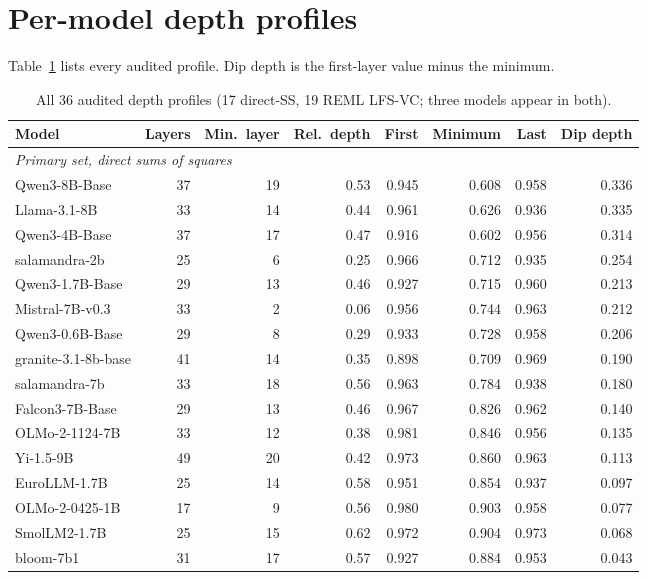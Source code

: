 \documentclass{article} %
\begin{document}
\section{Per-model depth profiles}
\label{app:profiles}
Table~\ref{tab:depth_profiles} lists every audited profile. Dip depth is the first-layer value minus the minimum.
\begin{table}[h]\caption{All 36 audited depth profiles (17 direct-SS, 19 REML LFS-VC; three models appear in both).}\label{tab:depth_profiles}
\begin{center}\scriptsize
\begin{tabular}{lrrrrrrr}
\toprule
Model & Layers & Min.\ layer & Rel.\ depth & First & Minimum & Last & Dip depth \\
\midrule
\multicolumn{8}{l}{\emph{Primary set, direct sums of squares}} \\
Qwen3-8B-Base & 37 & 19 & 0.53 & 0.945 & 0.608 & 0.958 & 0.336 \\
Llama-3.1-8B & 33 & 14 & 0.44 & 0.961 & 0.626 & 0.936 & 0.335 \\
Qwen3-4B-Base & 37 & 17 & 0.47 & 0.916 & 0.602 & 0.956 & 0.314 \\
salamandra-2b & 25 & 6 & 0.25 & 0.966 & 0.712 & 0.935 & 0.254 \\
Qwen3-1.7B-Base & 29 & 13 & 0.46 & 0.927 & 0.715 & 0.960 & 0.213 \\
Mistral-7B-v0.3 & 33 & 2 & 0.06 & 0.956 & 0.744 & 0.963 & 0.212 \\
Qwen3-0.6B-Base & 29 & 8 & 0.29 & 0.933 & 0.728 & 0.958 & 0.206 \\
granite-3.1-8b-base & 41 & 14 & 0.35 & 0.898 & 0.709 & 0.969 & 0.190 \\
salamandra-7b & 33 & 18 & 0.56 & 0.963 & 0.784 & 0.938 & 0.180 \\
Falcon3-7B-Base & 29 & 13 & 0.46 & 0.967 & 0.826 & 0.962 & 0.140 \\
OLMo-2-1124-7B & 33 & 12 & 0.38 & 0.981 & 0.846 & 0.956 & 0.135 \\
Yi-1.5-9B & 49 & 20 & 0.42 & 0.973 & 0.860 & 0.963 & 0.113 \\
EuroLLM-1.7B & 25 & 14 & 0.58 & 0.951 & 0.854 & 0.937 & 0.097 \\
OLMo-2-0425-1B & 17 & 9 & 0.56 & 0.980 & 0.903 & 0.958 & 0.077 \\
SmolLM2-1.7B & 25 & 15 & 0.62 & 0.972 & 0.904 & 0.973 & 0.068 \\
bloom-7b1 & 31 & 17 & 0.57 & 0.927 & 0.884 & 0.953 & 0.043 \\

\end{tabular}
\end{center}
\end{table}
\end{document}
